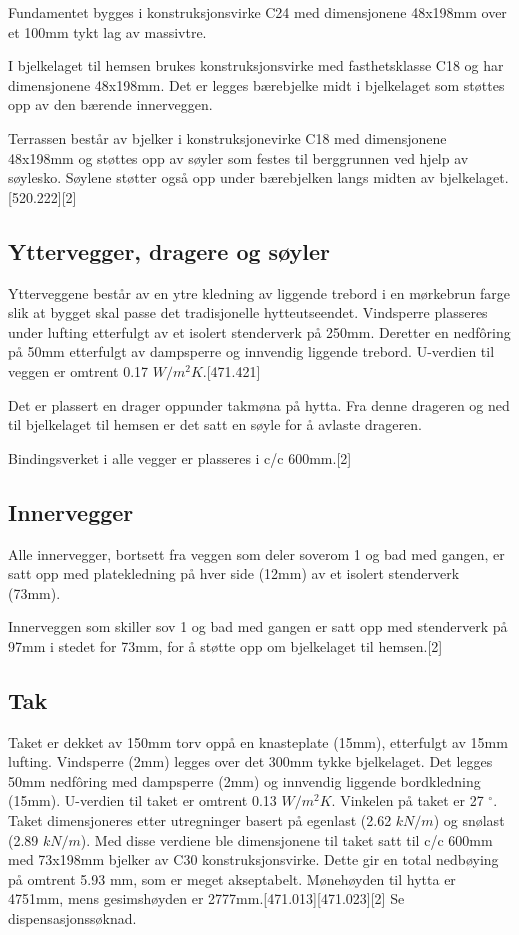 \documentclass[12pt]{article}
\begin{document}
Fundamentet bygges i konstruksjonsvirke C24 med dimensjonene 48x198mm over et 100mm tykt lag av massivtre.

I bjelkelaget til hemsen brukes konstruksjonsvirke med fasthetsklasse C18 og har dimensjonene 48x198mm. Det er legges bærebjelke midt i bjelkelaget som støttes opp av den bærende innerveggen.

Terrassen består av bjelker i konstruksjonevirke C18 med dimensjonene 48x198mm og støttes opp av søyler som festes til berggrunnen ved hjelp av søylesko. Søylene støtter også opp under bærebjelken langs midten av bjelkelaget.[520.222][2]


\subsection{Yttervegger, dragere og søyler}
Ytterveggene består av en ytre kledning av liggende trebord i en mørkebrun farge slik at bygget skal passe det tradisjonelle hytteutseendet. 
Vindsperre plasseres under lufting
etterfulgt av et isolert stenderverk på 250mm. Deretter en nedfôring på 50mm etterfulgt av dampsperre og innvendig liggende trebord. U-verdien til
veggen er omtrent 0.17 $W/m^2K$.[471.421]


Det er plassert en drager oppunder takmøna på hytta. Fra denne drageren og ned til bjelkelaget til hemsen er det satt en søyle for å avlaste drageren.

Bindingsverket i alle vegger er plasseres i c/c 600mm.[2]

\subsection{Innervegger}
Alle innervegger, bortsett fra veggen som deler soverom 1 og bad med gangen, er satt opp med platekledning på hver side (12mm) av et isolert stenderverk (73mm).

Innerveggen som skiller sov 1 og bad med gangen er satt opp med stenderverk på 97mm i stedet for 73mm, for å støtte opp om bjelkelaget til hemsen.[2]

\subsection{Tak}
Taket er dekket av 150mm torv oppå en  knasteplate (15mm), etterfulgt av 15mm lufting. Vindsperre (2mm) legges over det 300mm tykke bjelkelaget. Det legges 50mm nedfôring med dampsperre (2mm) og innvendig liggende bordkledning (15mm). U-verdien til taket er omtrent 0.13 $W/m^2K$. Vinkelen på taket er 27 $^\circ$.
Taket dimensjoneres etter utregninger basert på egenlast (2.62 $kN/m$) og snølast (2.89 $kN/m$). Med disse verdiene ble dimensjonene til taket satt til c/c 600mm med 73x198mm bjelker av C30 konstruksjonsvirke. Dette gir en total nedbøying på omtrent 5.93 mm, som er meget akseptabelt. Mønehøyden til hytta er 4751mm, mens gesimshøyden er 2777mm.[471.013][471.023][2] Se dispensasjonssøknad.
\end{document}
